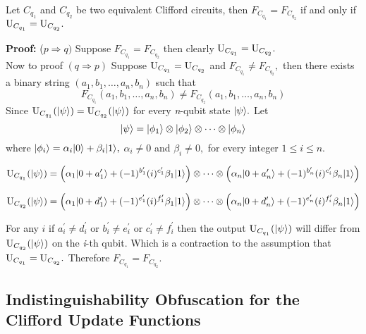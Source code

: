 \begin{lemma}
\label{sec:Clifford Functions Equivalence}
Let $C_{q_1}$ and $C_{q_2}$ be two equivalent Clifford circuits, then $F_{C_{q_1}}=F_{C_{q_2}}$ if and only if ${\rm U}_{C_{q_1}}={\rm U}_{C_{q_2}}.$
\end{lemma}
{\bf Proof:} ($p\Rightarrow q)$ Suppose $F_{C_{q_1}}=F_{C_{q_2}}$ then clearly ${\rm U}_{C_{q_1}}={\rm U}_{C_{q_2}}.$\\

		Now to proof $(q\Rightarrow p)$ Suppose ${\rm U}_{C_{q_1}}={\rm U}_{C_{q_2}}$ and $F_{C_{q_1}}\neq F_{C_{q_2}},$ then there exists a binary string $(a_1,b_1,\ldots, a_n,b_n)$ such that
		  $$ F_{C_{q_1}}(a_1,b_1,\ldots, a_n,b_n)\neq F_{C_{q_2}}(a_1,b_1,\ldots, a_n,b_n)$$
		  Since ${\rm U}_{C_{q_1}}({{\lvert}\psi\rangle})={\rm U}_{C_{q_2}}({{\lvert}\psi\rangle})$ for every {\em n}-qubit state ${{\lvert}\psi\rangle}.$ Let  $${{\lvert}\psi\rangle}={{\lvert}\phi_1\rangle} \otimes {{\lvert}\phi_2\rangle}\otimes \cdots \otimes {{\lvert}\phi_n\rangle}$$
		   where ${{\lvert}\phi_i\rangle} =\alpha_i {{\lvert}0\rangle}+ \beta_i{{\lvert}1\rangle},$  $\alpha_i\neq 0$ and $\beta_i\neq 0,$ for every integer $1\leq i\leq n.$
		
		  $${\rm U}_{C_{q_1}}({{\lvert}\psi\rangle})=\left(\alpha_1 {{\lvert}0+a^\prime_1\rangle}+(-1)^{b^\prime_1} (i)^{c^\prime_1} \beta_1{{\lvert}1\rangle}\right) \otimes \dots \otimes  \left(\alpha_n {{\lvert}0+a^\prime_n\rangle}+(-1)^{b^\prime_n} (i)^{c^\prime_i} \beta_n{{\lvert}1\rangle}\right)$$
		
		  $${\rm U}_{C_{q_2}}({{\lvert}\psi\rangle})=\left(\alpha_1 {{\lvert}0+d^\prime_1\rangle}+(-1)^{e^\prime_1} (i)^{f^\prime_1} \beta_1{{\lvert}1\rangle}\right) \otimes \dots  \otimes   \left(\alpha_n {{\lvert}0+d^\prime_n\rangle}+(-1)^{e^\prime_n} (i)^{f^\prime_i} \beta_n{{\lvert}1\rangle}\right)$$
		
		  For any $i$ if  $a^\prime_i\neq d^\prime_i$ or $b^\prime_i\neq e^\prime_i$ or $c^\prime_i\neq f^\prime_i$ then the output ${\rm U}_{C_{q_1}}({{\lvert}\psi\rangle})$ will differ from ${\rm U}_{C_{q_2}}({{\lvert}\psi\rangle})$ on the {\em i}-th qubit. Which is a contraction to the assumption that ${\rm U}_{C_{q_1}}={\rm U}_{C_{q_2}}.$  Therefore $F_{C_{q_1}}=F_{C_{q_2}}.$



\subsection{Indistinguishability Obfuscation for the Clifford Update Functions}
\label{sec: iO-clifford-functions}



